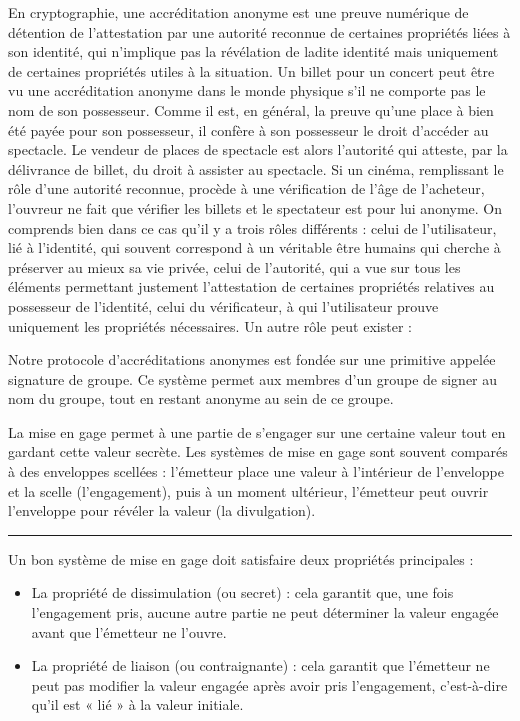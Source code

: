 En cryptographie, une accréditation anonyme est une preuve numérique de détention de l’attestation par une autorité reconnue de certaines propriétés liées à son identité, qui n’implique pas la révélation de ladite identité mais uniquement de certaines propriétés utiles à la situation. Un billet pour un concert peut être vu une accréditation anonyme dans le monde physique s’il ne comporte pas le nom de son possesseur. Comme il est, en général, la preuve qu’une place à bien été payée pour son possesseur, il confère à son possesseur le droit d’accéder au spectacle. Le vendeur de places de spectacle est alors l’autorité qui atteste, par la délivrance de billet, du droit à assister au spectacle. Si un cinéma, remplissant le rôle d’une autorité reconnue, procède à une vérification de l’âge de l’acheteur, l’ouvreur ne fait que vérifier les billets et le spectateur est pour lui anonyme. On comprends bien dans ce cas qu’il y a trois rôles différents : celui de l’utilisateur, lié à l’identité, qui souvent correspond à un véritable être humains qui cherche à préserver au mieux sa vie privée, celui de l’autorité, qui a vue sur tous les éléments permettant justement l’attestation de certaines propriétés relatives au possesseur de l’identité, celui du vérificateur, à qui l’utilisateur prouve uniquement les propriétés nécessaires. Un autre rôle peut exister :\par
Notre protocole d’accréditations anonymes est fondée sur une primitive appelée signature de groupe. Ce système permet aux membres d’un groupe de signer au nom du groupe, tout en restant anonyme au sein de ce groupe.\par 
La mise en gage permet à une partie de s'engager sur une certaine valeur tout en gardant cette valeur secrète. Les systèmes de mise en gage sont souvent comparés à des enveloppes scellées : l'émetteur place une valeur à l'intérieur de l'enveloppe et la scelle (l'engagement), puis à un moment ultérieur, l'émetteur peut ouvrir l'enveloppe pour révéler la valeur (la divulgation).\par

\hrule

Un bon système de mise en gage doit satisfaire deux propriétés principales :
\begin{itemize}
  \item La propriété de dissimulation (ou secret) : cela garantit que, une fois l'engagement pris, aucune autre partie ne peut déterminer la valeur engagée avant que l'émetteur ne l'ouvre.
  \item La propriété de liaison (ou contraignante) : cela garantit que l'émetteur ne peut pas modifier la valeur engagée après avoir pris l'engagement, c'est-à-dire qu'il est « lié » à la valeur initiale.
\end{itemize}

